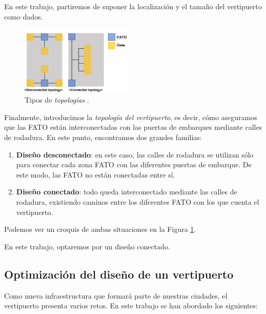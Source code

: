 \documentclass[12pt,a4paper]{book}
\begin{document}
En este trabajo, partiremos de suponer la localización y el tamaño del vertipuerto como dados.

 \begin{figure}
  \begin{center}
    \includegraphics[width=0.48\textwidth]{img/tipos_topologia.png}
  \end{center}
    \caption{Tipos de \textsl{topologías} \cite{park_vertiport_2022}.}
  \label{fig:topologia_verti}
\end{figure}

Finalmente, introducimos la \textsl{topología del vertipuerto}, es decir, cómo aseguramos que las FATO están interconectadas con las puertas de embarques mediante calles de rodadura. En este punto, encontramos dos grandes familias: 

	\begin{enumerate}
		\item \textbf{Diseño desconectado}: en este caso, las calles de rodadura se utilizan sólo para conectar cada zona FATO con las diferentes puertas de embarque. De este modo, las FATO no están conectadas entre sí.  
    \item \textbf{Diseño conectado}: todo queda interconectado mediante las calles de rodadura, existiendo caminos entre los diferentes FATO con los que cuenta el vertipuerto.  
	\end{enumerate}
Podemos ver un croquis de ambas situaciones en la Figura \ref{fig:topologia_verti}.


En este trabajo, optaremos por un diseño conectado. 
\subsection{Optimización del diseño de un vertipuerto} \label{Subsec: 1_2_3}
Como nueva infraestructura que formará parte de nuestras ciudades, el vertipuerto presenta varios retos. En este trabajo se han abordado los siguientes: 
\end{document}
